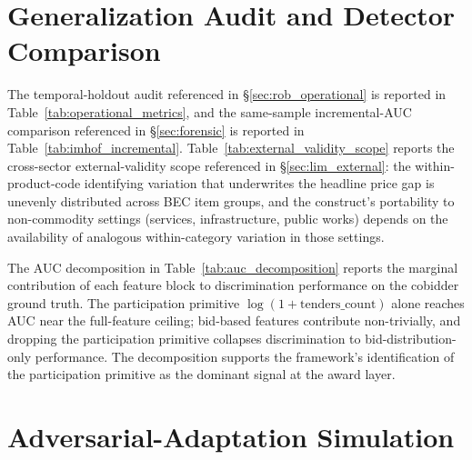 \begin{table}[htbp]
\centering
\caption{Price Coefficient Across IQR Multiplier Thresholds}
\label{tab:threshold}

\end{table}

\begin{table}[htbp]
\centering
\caption{Alternative Clustering of Standard Errors}
\label{tab:clustering}

\end{table}

\section{Generalization Audit and Detector Comparison}
\label{app:operational}

The temporal-holdout audit referenced in
§\ref{sec:rob_operational} is reported in
Table~\ref{tab:operational_metrics}, and the same-sample
incremental-AUC comparison referenced in §\ref{sec:forensic} is
reported in Table~\ref{tab:imhof_incremental}.
Table~\ref{tab:external_validity_scope} reports the cross-sector
external-validity scope referenced in §\ref{sec:lim_external}:
the within-product-code identifying variation that underwrites
the headline price gap is unevenly distributed across BEC item
groups, and the construct's portability to non-commodity
settings (services, infrastructure, public works) depends on
the availability of analogous within-category variation in those
settings.









The AUC decomposition in Table~\ref{tab:auc_decomposition} reports
the marginal contribution of each feature block to discrimination
performance on the cobidder ground truth. The participation
primitive $\log(1+\text{tenders\_count})$ alone reaches AUC near
the full-feature ceiling; bid-based features contribute
non-trivially, and dropping the participation primitive collapses
discrimination to bid-distribution-only performance. The
decomposition supports the framework's identification of the
participation primitive as the dominant signal at the award layer.

\section{Adversarial-Adaptation Simulation}
\label{app:adversarial}

